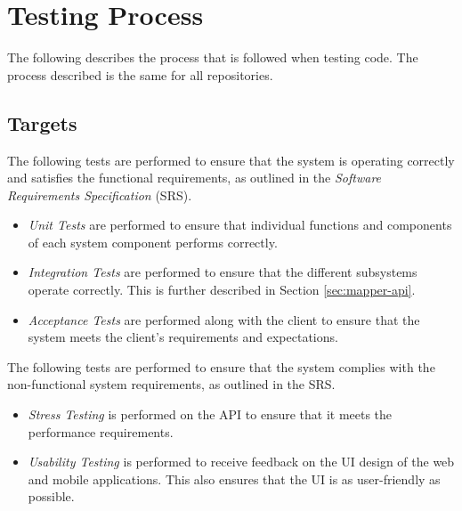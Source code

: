 \documentclass{article}
\begin{document}
    \newpage


    \section{Testing Process}
    \label{sec:process}

    The following describes the process that is followed when testing code. The
    process described is the same for all repositories.

    \subsection{Targets}
    \label{sec:targets}

    The following tests are performed to ensure that the system is operating
    correctly and satisfies the functional requirements, as outlined in the
    \textit{Software Requirements Specification} (SRS).

    \begin{itemize}
        \item \textit{Unit Tests} are performed to ensure that individual
            functions and components of each system component performs
            correctly.
        \item \textit{Integration Tests} are performed to ensure that the
            different subsystems operate correctly. This is further described
            in Section \ref{sec:mapper-api}.
        \item \textit{Acceptance Tests} are performed along with the client to
            ensure that the system meets the client's requirements and
            expectations.
    \end{itemize}

    The following tests are performed to ensure that the system complies with
    the non-functional system requirements, as outlined in the SRS.

    \begin{itemize}
        \item \textit{Stress Testing} is performed on the API to ensure
            that it meets the performance requirements.
        \item \textit{Usability Testing} is performed to receive feedback on
            the UI design of the web and mobile applications. This also ensures
            that the UI is as user-friendly as possible.
    \end{itemize}
\end{document}
